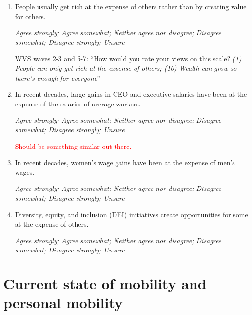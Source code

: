 \documentclass[11pt, headsepline]{article}
\newcommand{\red}[1]{\textcolor{red}{#1}}
\newcommand{\green}[1]{\textcolor{sharpgreen}{#1}}
\begin{document}
\begin{enumerate}[resume]

    \item People usually get rich at the expense of others rather than by creating value for others.

    \textit{Agree strongly; Agree somewhat; Neither agree nor disagree; Disagree somewhat; Disagree strongly; Unsure}

    \green{WVS waves 2-3 and 5-7: ``How would you rate your views on this scale? \textit{(1) People can only get rich at the expense of others; (10) Wealth can grow so there’s enough for everyone}''}

    \item In recent decades, large gains in CEO and executive salaries have been at the expense of the salaries of average workers.

    \textit{Agree strongly; Agree somewhat; Neither agree nor disagree; Disagree somewhat; Disagree strongly; Unsure}

    \red{Should be something similar out there.}

    \item In recent decades, women’s wage gains have been at the expense of men’s wages.

    \textit{Agree strongly; Agree somewhat; Neither agree nor disagree; Disagree somewhat; Disagree strongly; Unsure}

    \item Diversity, equity, and inclusion (DEI) initiatives create opportunities for some at the expense of others.

    \textit{Agree strongly; Agree somewhat; Neither agree nor disagree; Disagree somewhat; Disagree strongly; Unsure}
    
\end{enumerate}

\section*{Current state of mobility and personal mobility}
\end{document}
